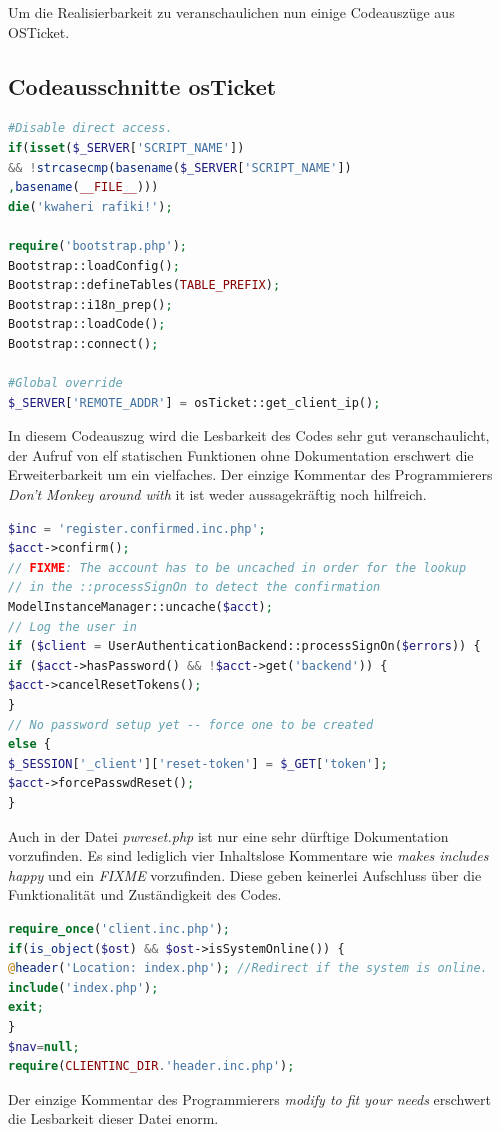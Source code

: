 Um die Realisierbarkeit zu veranschaulichen nun einige Codeauszüge aus OSTicket.
\newpage
\subsection{Codeausschnitte osTicket}
\begin{lstlisting}[language=PHP, caption=main.inc.php, firstnumber=18]
#Disable direct access.
if(isset($_SERVER['SCRIPT_NAME'])
&& !strcasecmp(basename($_SERVER['SCRIPT_NAME'])
,basename(__FILE__)))
die('kwaheri rafiki!');

require('bootstrap.php');
Bootstrap::loadConfig();
Bootstrap::defineTables(TABLE_PREFIX);
Bootstrap::i18n_prep();
Bootstrap::loadCode();
Bootstrap::connect();

#Global override
$_SERVER['REMOTE_ADDR'] = osTicket::get_client_ip();

\end{lstlisting}


In diesem Codeauszug wird die Lesbarkeit des Codes sehr gut veranschaulicht, der Aufruf von elf statischen Funktionen ohne Dokumentation erschwert die Erweiterbarkeit um ein vielfaches. Der einzige Kommentar des Programmierers \textit{Don't Monkey around with} it ist weder aussagekräftig noch hilfreich.
\newpage
\begin{lstlisting}[language=PHP, caption=pwreset.php, firstnumber=51]
$inc = 'register.confirmed.inc.php';
$acct->confirm();
// FIXME: The account has to be uncached in order for the lookup
// in the ::processSignOn to detect the confirmation
ModelInstanceManager::uncache($acct);
// Log the user in
if ($client = UserAuthenticationBackend::processSignOn($errors)) {
if ($acct->hasPassword() && !$acct->get('backend')) {
$acct->cancelResetTokens();
}
// No password setup yet -- force one to be created
else {
$_SESSION['_client']['reset-token'] = $_GET['token'];
$acct->forcePasswdReset();
}
\end{lstlisting}

Auch in der Datei \textit{pwreset.php} ist nur eine sehr dürftige Dokumentation vorzufinden. Es sind lediglich vier Inhaltslose Kommentare wie \textit{makes includes happy} und ein \textit{FIXME} vorzufinden. Diese geben keinerlei Aufschluss über die Funktionalität und Zuständigkeit des Codes.
\newpage
\begin{lstlisting}[language=PHP, caption=offline.php, firstnumber=16]
require_once('client.inc.php');
if(is_object($ost) && $ost->isSystemOnline()) {
@header('Location: index.php'); //Redirect if the system is online.
include('index.php');
exit;
}
$nav=null;
require(CLIENTINC_DIR.'header.inc.php');
\end{lstlisting}
Der einzige Kommentar des Programmierers \textit{modify to fit your needs} erschwert die Lesbarkeit dieser Datei enorm.


